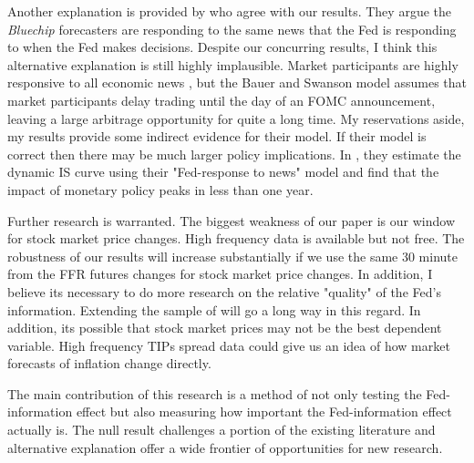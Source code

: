 \documentclass[a4paper,man,floatsintext,natbib]{apa6}
\begin{document}
		Another explanation is provided by \cite{Bauer2020} who agree with our results. They argue the \textit{Bluechip} forecasters are responding to the same news that the Fed is responding to when the Fed makes decisions. Despite our concurring results, I think this alternative explanation is still highly implausible. Market participants are highly responsive to all economic news \citep{Gurkaynak2011}, but the Bauer and Swanson model assumes that market participants delay trading until the day of an FOMC announcement, leaving a large arbitrage opportunity for quite a long time. My reservations aside, my results provide some indirect evidence for their model. If their model is correct then there may be much larger policy implications. In \cite{Bauer2020}, they estimate the dynamic IS curve using their "Fed-response to news" model and find that the impact of monetary policy peaks in less than one year.
		
		Further research is warranted. The biggest weakness of our paper is our window for stock market price changes. High frequency data is available but not free. The robustness of our results will increase substantially if we use the same 30 minute from the FFR futures changes for stock market price changes. In addition, I believe its necessary to do more research on the relative "quality" of the Fed's information. Extending the sample of \cite{Romer2000} will go a long way in this regard. In addition, its possible that stock market prices may not be the best dependent variable. High frequency TIPs spread data could give us an idea of how market forecasts of inflation change directly. 
		
		The main contribution of this research is a method of not only testing the Fed-information effect but also measuring how important the Fed-information effect actually is. The null result challenges a portion of the existing literature and alternative explanation offer a wide frontier of opportunities for new research.
		
\end{document}
